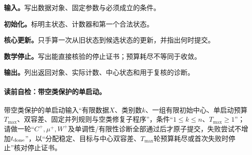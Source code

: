 \begingroup
\renewcommand{\thealgocf}{\thechapter.\arabic{algocf}A}
\begin{keypointbox}[title={带空类保护的单启动：五步阅读}]
\textbf{输入。}写出数据对象、固定参数与必须成立的条件。\par
\textbf{初始化。}标明主状态、计数器和第一个合法状态。\par
\textbf{核心更新。}只手算一次从旧状态到候选状态的更新，并指出何时提交。\par
\textbf{数学停止。}写出能直接核验的停止证书；预算耗尽不等同于收敛。\par
\textbf{输出。}列出返回对象、实际计数、中心状态和用于复核的诊断。
\end{keypointbox}
\paragraph{读前自检：带空类保护的单启动。}带空类保护的单启动输入“有限数据$X$、类别数$k$、一组有限初始中心、单启动预算$T_{\max}$、双容差、固定并列规则与空类修复子程序”，条件“$1\le k\le n$、$T_{\max}\ge1$”；请做一轮“$C^+,\mu^+,W^+$及单调性/有限性诊断全部通过后才原子提交，失败尝试不增加$t_{\rm done}$”，以“分配稳定、目标与中心双容差、$T_{\max}$轮预算耗尽或首次失败时停止”核对停止证书。\par

